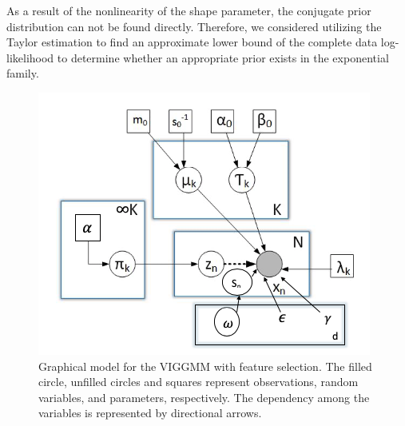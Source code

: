 \documentclass[letterpaper]{article}
\begin{document}
As a result of the nonlinearity of the shape parameter, the conjugate prior distribution can not be found directly. Therefore, we considered utilizing the Taylor estimation to find an approximate lower bound of the complete data log-likelihood to determine whether an appropriate prior exists in the exponential family.



\begin{figure}[h!]
    \begin{center}
        \includegraphics[width=0.7\linewidth]{pictures/graphicalmodel_v1.png}
        \caption{Graphical model for the VIGGMM with feature selection. 
        The filled circle, unfilled circles and squares represent observations, random variables, and parameters, respectively. The dependency among the variables is represented by directional arrows.}
        \label{VGGM Graphical Model}    
    \end{center}
\end{figure}
\end{document}
